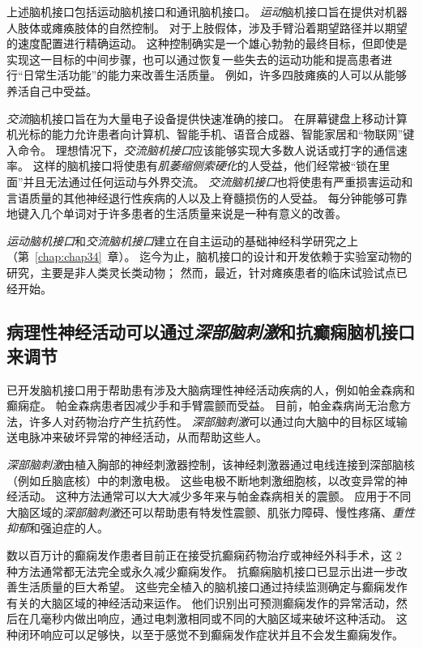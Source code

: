 上述脑机接口包括运动脑机接口和通讯脑机接口。
\textit{运动}脑机接口旨在提供对机器人肢体或瘫痪肢体的自然控制。
对于上肢假体，涉及手臂沿着期望路径并以期望的速度配置进行精确运动。
这种控制确实是一个雄心勃勃的最终目标，但即使是实现这一目标的中间步骤，也可以通过恢复一些失去的运动功能和提高患者进行“日常生活功能”的能力来改善生活质量。
例如，许多四肢瘫痪的人可以从能够养活自己中受益。


\textit{交流}脑机接口旨在为大量电子设备提供快速准确的接口。
在屏幕键盘上移动计算机光标的能力允许患者向计算机、智能手机、语音合成器、智能家居和“物联网”键入命令。 
理想情况下，\textit{交流脑机接口}应该能够实现大多数人说话或打字的通信速率。
这样的脑机接口将使患有\textit{肌萎缩侧索硬化}的人受益，他们经常被“锁在里面”并且无法通过任何运动与外界交流。
\textit{交流脑机接口}也将使患有严重损害运动和言语质量的其他神经退行性疾病的人以及上脊髓损伤的人受益。
每分钟能够可靠地键入几个单词对于许多患者的生活质量来说是一种有意义的改善。


\textit{运动脑机接口}和\textit{交流脑机接口}建立在自主运动的基础神经科学研究之上（第~\ref{chap:chap34}~章）。 
迄今为止，脑机接口的设计和开发依赖于实验室动物的研究，主要是非人类灵长类动物；
然而，最近，针对瘫痪患者的临床试验试点已经开始。



\subsection{病理性神经活动可以通过\textit{深部脑刺激}和抗癫痫脑机接口来调节}

已开发脑机接口用于帮助患有涉及大脑病理性神经活动疾病的人，例如帕金森病和癫痫症。
帕金森病患者因减少手和手臂震颤而受益。
目前，帕金森病尚无治愈方法，许多人对药物治疗产生抗药性。
\textit{深部脑刺激}可以通过向大脑中的目标区域输送电脉冲来破坏异常的神经活动，从而帮助这些人。


\textit{深部脑刺激}由植入胸部的神经刺激器控制，该神经刺激器通过电线连接到深部脑核（例如丘脑底核）中的刺激电极。
这些电极不断地刺激细胞核，以改变异常的神经活动。 
这种方法通常可以大大减少多年来与帕金森病相关的震颤。
应用于不同大脑区域的\textit{深部脑刺激}还可以帮助患有特发性震颤、肌张力障碍、慢性疼痛、\textit{重性抑郁}和强迫症的人。


数以百万计的癫痫发作患者目前正在接受抗癫痫药物治疗或神经外科手术，这 2 种方法通常都无法完全或永久减少癫痫发作。
抗癫痫脑机接口已显示出进一步改善生活质量的巨大希望。
这些完全植入的脑机接口通过持续监测确定与癫痫发作有关的大脑区域的神经活动来运作。 
他们识别出可预测癫痫发作的异常活动，然后在几毫秒内做出响应，通过电刺激相同或不同的大脑区域来破坏这种活动。 
这种闭环响应可以足够快，以至于感觉不到癫痫发作症状并且不会发生癫痫发作。



